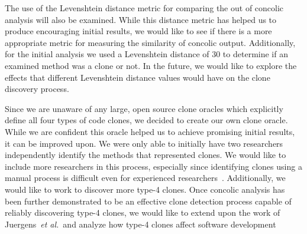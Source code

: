 \documentclass{sig-alternate}
\begin{document}
The use of the Levenshtein distance metric for comparing the out of concolic analysis will also be examined. While this distance metric has helped us to produce encouraging initial results, we would like to see if there is a more appropriate metric for measuring the similarity of concolic output. Additionally, for the initial analysis we used a Levenshtein distance of 30 to determine if an examined method was a clone or not. In the future, we would like to  explore the effects that different Levenshtein distance values would have on the clone discovery process.

Since we are unaware of any large, open source clone oracles which explicitly define all four types of code clones, we decided to create our own clone oracle. While we are confident this oracle helped us to achieve promising initial results, it can be improved upon. We were only able to initially have two researchers independently identify the methods that represented clones. We would like to include more researchers in this process, especially since identifying clones using a manual process is difficult even for experienced researchers~\cite{Walenstein:2003:PCT:950792.951349}. Additionally, we would like to work to discover more type-4 clones. Once concolic analysis has been further demonstrated to be an effective clone detection process capable of reliably discovering type-4 clones, we would like to extend upon the work of Juergens~\emph{et al.}~\cite{Juergens:2009:CCM:1555001.1555062}and analyze how type-4 clones affect software development





%

  

\end{document}
